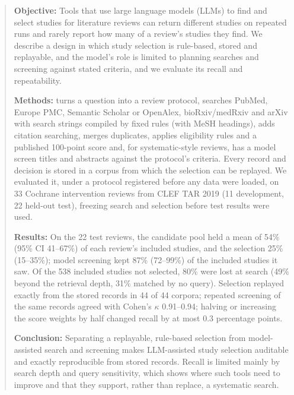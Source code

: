 \begin{abstract}
\textbf{Objective:} Tools that use large language models (LLMs) to find and select studies for literature reviews
can return different studies on repeated runs and rarely report how many of a review's studies they find. We
describe a design in which study selection is rule-based, stored and replayable, and the model's role is limited to
planning searches and screening against stated criteria, and we evaluate its recall and repeatability.

\textbf{Methods:} \tool{} turns a question into a review protocol, searches PubMed, Europe PMC, Semantic Scholar or
OpenAlex, bioRxiv/medRxiv and arXiv with search strings compiled by fixed rules (with MeSH headings), adds
citation searching, merges duplicates, applies eligibility rules and a published 100-point score and, for
systematic-style reviews, has a model screen titles and abstracts against the protocol's criteria. Every record and
decision is stored in a corpus from which the selection can be replayed. We evaluated it, under a protocol
registered before any data were loaded, on 33 Cochrane intervention reviews from CLEF TAR 2019 (11 development, 22
held-out test), freezing search and selection before test results were used.

\textbf{Results:} On the 22 test reviews, the candidate pool held a mean of 54\% (95\% CI 41--67\%) of each review's
included studies, and the selection 25\% (15--35\%); model screening kept 87\% (72--99\%) of the included studies it
saw. Of the 538 included studies not selected, 80\% were lost at search (49\% beyond the retrieval depth, 31\%
matched by no query). Selection replayed exactly from the stored records in 44 of 44 corpora; repeated screening of
the same records agreed with Cohen's $\kappa$ 0.91--0.94; halving or increasing the score weights by half changed
recall by at most 0.3 percentage points. 

\textbf{Conclusion:} Separating a replayable, rule-based selection from model-assisted search and screening makes
LLM-assisted study selection auditable and exactly reproducible from stored records. Recall is limited mainly by
search depth and query sensitivity, which shows where such tools need to improve and that they support, rather
than replace, a systematic search.
\end{abstract}

